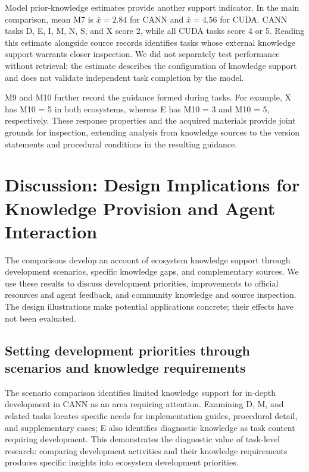 \documentclass[manuscript,review,anonymous]{acmart}
\begin{document}
Model prior-knowledge estimates provide another support indicator. In the main comparison, mean M7 is \(\bar{x}=2.84\) for CANN and \(\bar{x}=4.56\) for CUDA. CANN tasks D, E, I, M, N, S, and X score 2, while all CUDA tasks score 4 or 5. Reading this estimate alongside source records identifies tasks whose external knowledge support warrants closer inspection. We did not separately test performance without retrieval; the estimate describes the configuration of knowledge support and does not validate independent task completion by the model.

M9 and M10 further record the guidance formed during tasks. For example, X has M10 = 5 in both ecosystems, whereas E has M10 = 3 and M10 = 5, respectively. These response properties and the acquired materials provide joint grounds for inspection, extending analysis from knowledge sources to the version statements and procedural conditions in the resulting guidance.

\section{Discussion: Design Implications for Knowledge Provision and Agent Interaction}\label{discussion-design-implications-for-knowledge-provision-and-agent-interaction}

The comparisons develop an account of ecosystem knowledge support through development scenarios, specific knowledge gaps, and complementary sources. We use these results to discuss development priorities, improvements to official resources and agent feedback, and community knowledge and source inspection. The design illustrations make potential applications concrete; their effects have not been evaluated.

\subsection{Setting development priorities through scenarios and knowledge requirements}\label{setting-development-priorities-through-scenarios-and-knowledge-requirements}

The scenario comparison identifies limited knowledge support for in-depth development in CANN as an area requiring attention. Examining D, M, and related tasks locates specific needs for implementation guides, procedural detail, and supplementary cases; E also identifies diagnostic knowledge as task content requiring development. This demonstrates the diagnostic value of task-level research: comparing development activities and their knowledge requirements produces specific insights into ecosystem development priorities.
\end{document}
